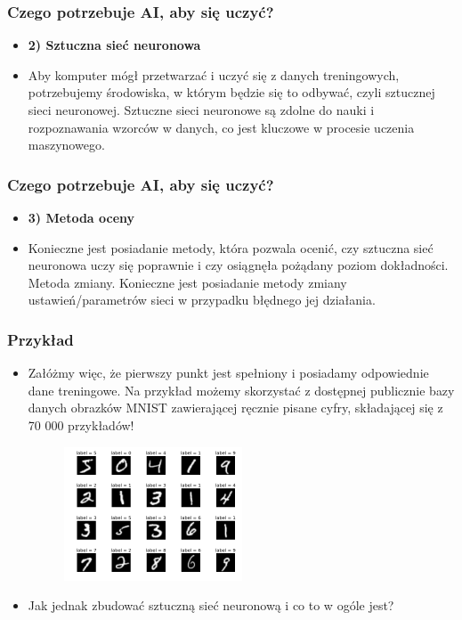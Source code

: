 \documentclass{beamer}
\begin{document}
\begin{frame}[fragile]
\frametitle{Czego potrzebuje AI, aby się uczyć?}
\begin{itemize}
\item \textbf{2) Sztuczna sieć neuronowa}
\item Aby komputer mógł przetwarzać i uczyć się z danych treningowych, potrzebujemy środowiska, w którym będzie się to odbywać, czyli sztucznej sieci neuronowej. Sztuczne sieci neuronowe są zdolne do nauki i rozpoznawania wzorców w danych, co jest kluczowe w procesie uczenia maszynowego. 
\end{itemize}
\end{frame}

\begin{frame}[fragile]
\frametitle{Czego potrzebuje AI, aby się uczyć?}
\begin{itemize}
\item \textbf{3) Metoda oceny}
\item Konieczne jest posiadanie metody, która pozwala ocenić, czy sztuczna sieć neuronowa uczy się poprawnie i czy osiągnęła pożądany poziom dokładności.
 Metoda zmiany. Konieczne jest posiadanie metody zmiany ustawień/parametrów sieci w przypadku błędnego jej działania. 
\end{itemize}
\end{frame}

\begin{frame}[fragile]
\frametitle{Przykład}
\begin{itemize}
\item Załóżmy więc, że pierwszy punkt jest spełniony i posiadamy odpowiednie dane treningowe. Na przykład możemy skorzystać z dostępnej publicznie bazy danych obrazków MNIST zawierającej ręcznie pisane cyfry, składającej się z 70 000 przykładów!

                    \begin{figure}[h]
                        \centering
                        \includegraphics[width=0.5\textwidth]{../../img/mnist_plot.png}
                    \end{figure}                    
                    \item Jak jednak zbudować sztuczną sieć neuronową i co to w ogóle jest? 
\end{itemize}

\end{frame}
\end{document}
